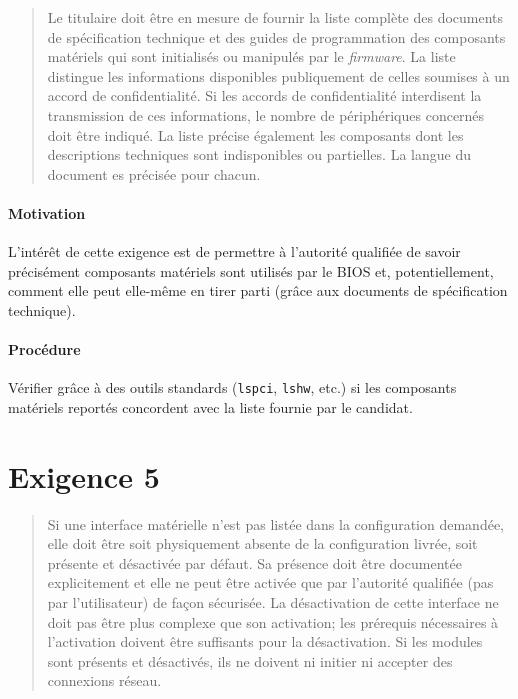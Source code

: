 \documentclass{report}
\begin{document}
\begin{quote}
  Le titulaire doit être en mesure de fournir la liste complète des documents de
  spécification technique et des guides de programmation des composants
  matériels qui sont initialisés ou manipulés par le \emph{firmware}.
  La liste distingue les informations disponibles publiquement de celles
  soumises à un accord de confidentialité.
  Si les accords de confidentialité interdisent la transmission de ces
  informations, le nombre de périphériques concernés doit être indiqué.
  La liste précise également les composants dont les descriptions techniques
  sont indisponibles ou partielles.
  La langue du document es précisée pour chacun.
\end{quote}

\paragraph{Motivation}
%
L’intérêt de cette exigence est de permettre à l’autorité qualifiée de savoir
précisément composants matériels sont utilisés par le BIOS et, potentiellement,
comment elle peut elle-même en tirer parti (grâce aux documents de spécification
technique).

\paragraph{Procédure}
%
Vérifier grâce à des outils standards (\texttt{lspci}, \texttt{lshw}, etc.)  si
les composants matériels reportés concordent avec la liste fournie par le
candidat.

\section{Exigence 5}

\begin{quote}
  Si une interface matérielle n’est pas listée dans la configuration demandée,
  elle doit être soit physiquement absente de la configuration livrée, soit
  présente et désactivée par défaut.
  Sa présence doit être documentée explicitement et elle ne peut être activée
  que par l’autorité qualifiée (pas par l’utilisateur) de façon sécurisée.
  La désactivation de cette interface ne doit pas être plus complexe que son
  activation; les prérequis nécessaires à l’activation doivent être suffisants
  pour la désactivation. Si les modules sont présents et désactivés, ils ne
  doivent ni initier ni accepter des connexions réseau.
\end{quote}
\end{document}
